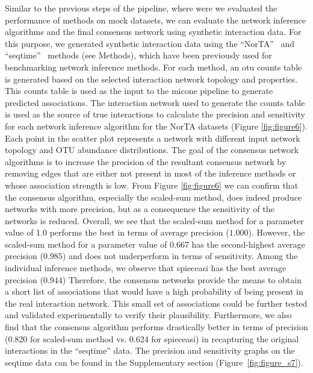   Similar to the previous steps of the pipeline, where were we evaluated the performance of methods on mock datasets, we can evaluate the network inference algorithms and the final consensus network using synthetic interaction data.
  For this purpose, we generated synthetic interaction data using the ``NorTA''~\cite{Kurtz2015} and ``seqtime''~\cite{faustSignaturesEcologicalProcesses2018} methods (see Methods), which have been previously used for benchmarking network inference methods.
  For each method, an \ac{otu} counts table is generated based on the selected interaction network topology and properties.
  This counts table is used as the input to the \ac{micone} pipeline to generate predicted associations.
  The interaction network used to generate the counts table is used as the source of true interactions to calculate the precision and sensitivity for each network inference algorithm for the NorTA datasets (Figure \ref{fig:figure6}).
  Each point in the scatter plot represents a network with different input network topology and OTU abundance distributions.
  The goal of the consensus network algorithms is to increase the precision of the resultant consensus network by removing edges that are either not present in most of the inference methods or whose association strength is low.
  From Figure \ref{fig:figure6} we can confirm that the consensus algorithm, especially the scaled-sum method, does indeed produce networks with more precision, but as a consequence the sensitivity of the networks is reduced.
  Overall, we see that the scaled-sum method for a parameter value of 1.0 performs the best in terms of average precision ($1.000$).
  However, the scaled-sum method for a parameter value of 0.667 has the second-highest average precision ($0.985$) and does not underperform in terms of sensitivity.
  Among the individual inference methods, we observe that \ac{spieceasi} has the best average precision ($0.944$)
  Therefore, the consensus networks provide the means to obtain a short list of associations that would have a high probability of being present in the real interaction network.
  This small set of associations could be further tested and validated experimentally to verify their plausibility.
  Furthermore, we also find that the consensus algorithm performs drastically better in terms of precision (0.820 for scaled-sum method vs. 0.624 for \ac{spieceasi}) in recapturing the original interactions in the ``seqtime'' data.
  The precision and sensitivity graphs on the seqtime data can be found in the Supplementary section (Figure~\ref{fig:figure_s7}).

